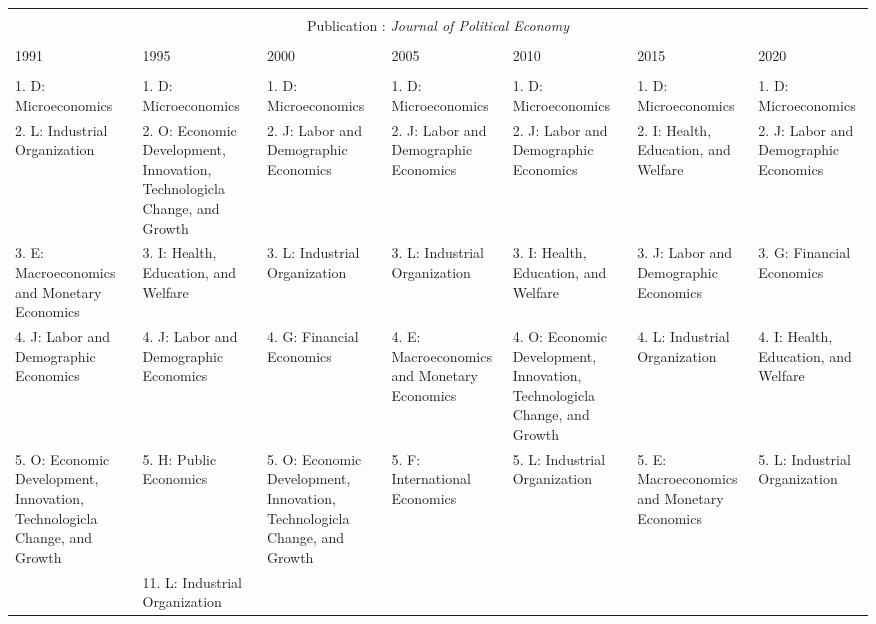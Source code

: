 \begin{table}[h]
\begin{tabular}{@{\extracolsep{5pt}} lllllll}
\hline \\[-1.8ex] \multicolumn{7}{c}{Publication : \textit{Journal of Political Economy}} \\
 \cline{1-7} \\
1991 & 1995 & 2000 & 2005 & 2010 & 2015 & 2020 \\ 
\hline \\[-1.8ex] 
1. D: Microeconomics & 1. D: Microeconomics & 1. D: Microeconomics & 1. D: Microeconomics & 1. D: Microeconomics & 1. D: Microeconomics & 1. D: Microeconomics \\ 
2. L: Industrial Organization & 2. O: Economic Development, Innovation, Technologicla Change, and Growth & 2. J: Labor and Demographic Economics & 2. J: Labor and Demographic Economics & 2. J: Labor and Demographic Economics & 2. I: Health, Education, and Welfare & 2. J: Labor and Demographic Economics \\ 
3. E: Macroeconomics and Monetary Economics & 3. I: Health, Education, and Welfare & 3. L: Industrial Organization & 3. L: Industrial Organization & 3. I: Health, Education, and Welfare & 3. J: Labor and Demographic Economics & 3. G: Financial Economics \\ 
4. J: Labor and Demographic Economics & 4. J: Labor and Demographic Economics & 4. G: Financial Economics & 4. E: Macroeconomics and Monetary Economics & 4. O: Economic Development, Innovation, Technologicla Change, and Growth & 4. L: Industrial Organization & 4. I: Health, Education, and Welfare \\ 
5. O: Economic Development, Innovation, Technologicla Change, and Growth & 5. H: Public Economics & 5. O: Economic Development, Innovation, Technologicla Change, and Growth & 5. F: International Economics & 5. L: Industrial Organization & 5. E: Macroeconomics and Monetary Economics & 5. L: Industrial Organization \\ 
 & 11. L: Industrial Organization &  &  &  &  &  \\ 


\end{tabular}
\end{table}
